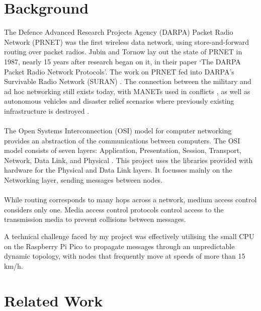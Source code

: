 \documentclass[12pt,a4paper]{report}
\begin{document}
\section{Background}
The Defence Advanced Research Projects Agency (DARPA) Packet Radio Network (PRNET) \cite{prnet} was the first wireless data network, using store-and-forward routing over packet radios. Jubin and Tornow lay out the state of PRNET in 1987, nearly 15 years after research began on it, in their paper `The DARPA Packet Radio Network Protocols'. The work on PRNET fed into DARPA's Survivable Radio Network (SURAN) \cite{suran}. The connection between the military and ad hoc networking still exists today, with MANETs used in conflicts \cite{military}, as well as autonomous vehicles \cite{vehicle} and disaster relief scenarios where previously existing infrastructure is destroyed \cite{disaster}. \\ \\ 
The Open Systems Interconnection (OSI) model for computer networking provides an abstraction of the communications between computers. The OSI model consists of seven layers: Application, Presentation, Session, Transport, Network, Data Link, and Physical \cite{ib}. This project uses the libraries provided with hardware for the Physical and Data Link layers. It focusses mainly on the Networking layer, sending messages between nodes. \\ \\ 
While routing corresponds to many hops across a network, medium access control considers only one. Media access control protocols control access to the transmission media to prevent collisions between messages. 

A technical challenge faced by my project was effectively utilising the small CPU on the Raspberry Pi Pico \cite{rp2040} to propagate messages through an unpredictable dynamic topology, with nodes that frequently move at speeds of more than 15 km/h.

\section{Related Work}
\end{document}
